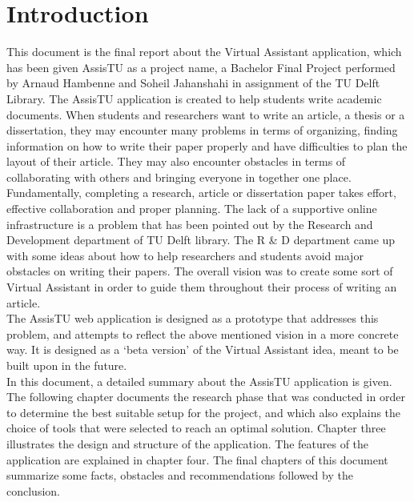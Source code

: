 \chapter{Introduction}

This document is the final report about the Virtual Assistant application, which has been given AssisTU as a project name, a Bachelor Final Project performed by Arnaud Hambenne and Soheil Jahanshahi in
assignment of the TU Delft Library. 
The AssisTU application is created to help students write academic documents. When students and researchers want to write an article, a thesis or a dissertation, they may encounter many problems in terms of organizing, finding information on how to write their paper properly and have difficulties to plan the layout of their article. They may also encounter obstacles in terms of collaborating with others and bringing everyone in together one 
place. \\

Fundamentally, completing a research, article or dissertation paper takes effort, effective collaboration and proper planning. The lack of a supportive
online infrastructure is a problem that has been pointed out by the Research and Development department of TU Delft library. The R \& D department came 
up with some ideas about how to help researchers and students avoid major obstacles on writing their papers. The overall vision was to create some sort of Virtual Assistant in order to guide them throughout their process of writing an article.\\

The AssisTU web application is designed as a prototype that addresses this problem, and attempts to reflect the above mentioned vision in a more concrete way. It is designed as a `beta version' of the Virtual Assistant idea, meant to be built upon in the future.\\ 

In this document, a detailed summary about the AssisTU application is given. The following chapter documents the research phase that was conducted in order to determine the best suitable setup for the project, and which also explains the choice of tools that were selected to reach an optimal solution. 
Chapter three illustrates the design and structure of the application. The features of the application are explained in chapter four. The final chapters of this document summarize some facts, obstacles and recommendations followed by the conclusion.  